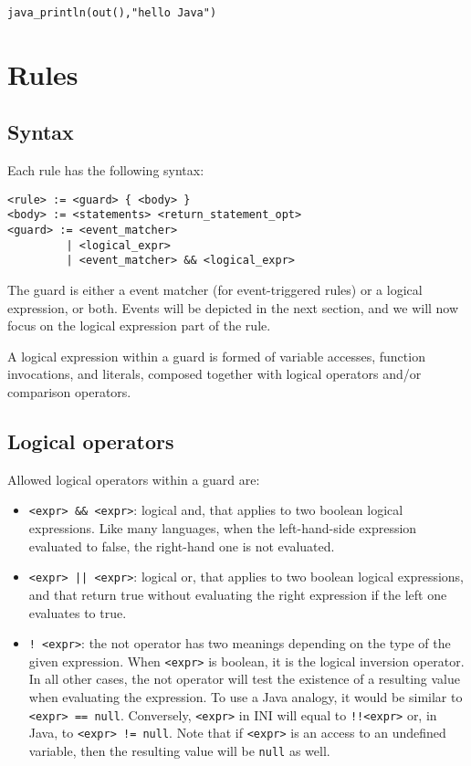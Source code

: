 \documentclass[11pt]{report}
\begin{document}
\begin{verbatim}
java_println(out(),"hello Java")
\end{verbatim}

\section{Rules}

\subsection{Syntax}

Each rule has the following syntax:

\begin{verbatim}
<rule> := <guard> { <body> }
<body> := <statements> <return_statement_opt>
<guard> := <event_matcher>
         | <logical_expr>
         | <event_matcher> && <logical_expr>
\end{verbatim}

The guard is either a event matcher (for event-triggered rules) or a logical expression, or both. Events will be depicted in the next section, and we will now focus on the logical expression part of the rule.

A logical expression within a guard is formed of variable accesses, function invocations, and literals, composed together with logical operators and/or comparison operators.

\subsection{Logical operators}

Allowed logical operators within a guard are:

\begin{itemize}
\item \texttt{<expr> \&\& <expr>}: logical and, that applies to two boolean logical expressions. Like many languages, when the left-hand-side expression evaluated to false, the right-hand one is not evaluated.
\item \texttt{<expr> || <expr>}: logical or, that applies to two boolean logical expressions, and that return true without evaluating the right expression if the left one evaluates to true.
\item \texttt{! <expr>}: the not operator has two meanings depending on the type of the given expression. When \texttt{<expr>} is boolean, it is the logical inversion operator. In all other cases, the not operator will test the existence of a resulting value when evaluating the expression. To use a Java analogy, it would be similar to \texttt{<expr> == null}. Conversely, \texttt{<expr>} in INI will equal to \texttt{!!<expr>} or, in Java, to \texttt{<expr> != null}. Note that if \texttt{<expr>} is an access to an undefined variable, then the resulting value will be \texttt{null} as well.
\end{itemize}
\end{document}
